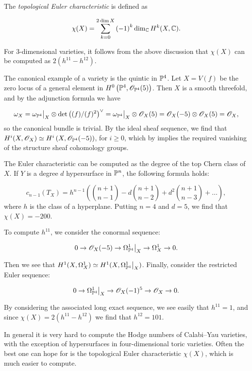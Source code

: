 The \emph{topological Euler characteristic} is defined as

$$
\chi(X) = \sum_{k=0}^{2 \dim X}\left(-1\right)^k \dim_\C H^k(X, \C).
$$

For 3-dimensional \CY varieties, it follows from the above discussion that $\chi(X)$ can be computed as $2(h^{11} - h^{12})$. 

\begin{example}
The canonical example of a \CY variety is the quintic in $\P^4$. Let $X=V(f)$ be the zero locus of a general element in $H^0\left(\P^4,\OO_{\P^4}(5)\right)$. Then $X$ is a smooth threefold, and by the adjunction formula we have 

\[
\omega_X = \restr{\omega_{\P^4}}{X} \otimes \det {\left( (f)/(f)^2 \right)}^\vee = \restr{\omega_{\P^4}}{X} \otimes \OO_X(5)=\OO_X(-5) \otimes \OO_X(5) = \OO_X,
\]
so the canonical bundle is trivial. By the ideal sheaf sequence, we find that $H^i(X,\OO_X) \simeq H^i\left(X,\OO_{\P^4}(-5)\right)$, for $i \geq 0$, which by \cite[Theorem 5.1, Chapter III]{hartshorne} implies the required vanishing of the structure sheaf cohomology groups.

The Euler characteristic can be computed as the degree of the top Chern class of $X$. If $Y$ is a degree $d$ hypersurface in $\P^n$, the following formula holds:

$$
c_{n-1}(T_X) = h^{n-1} \left( \binom{n+1}{n-1} - d \binom{n+1}{n-2} + d^2 \binom{n+1}{n-3} + \ldots\right),
$$
where $h$ is the class of a hyperplane. Putting $n=4$ and $d=5$, we find that $\chi(X)=-200$.

To compute $h^{11}$, we consider the conormal sequence:

\[
0 \to \OO_X(-5) \to \restr{\Omega_{\P^4}^1}{X} \to \Omega_X^1 \to 0.
\]

Then we see that $H^1(X,\Omega_X^1) \simeq H^1(X,\restr{\Omega_{\P^4}^1}{X})$. Finally, consider the restricted Euler sequence:

\[
0 \to \restr{\Omega_{\P^4}^1}{X} \to \OO_X(-1)^5  \to \OO_X \to 0.
\]

By considering the associated long exact sequence, we see easily that $h^{11}=1$, and since $\chi(X)=2(h^{11}-h^{12})$ we find that $h^{12}=101$.
\end{example}

In general it is very hard to compute the Hodge numbers of Calabi--Yau varieties, with the exception of hypersurfaces in four-dimensional toric varieties. Often the best one can hope for is the topological Euler characteristic $\chi(X)$, which is much easier to compute.

